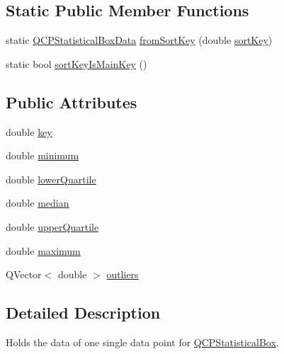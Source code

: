 \subsection*{Static Public Member Functions}
\begin{DoxyCompactItemize}
\item 
static \mbox{\hyperlink{class_q_c_p_statistical_box_data}{Q\+C\+P\+Statistical\+Box\+Data}} \mbox{\hyperlink{class_q_c_p_statistical_box_data_a8c391d5a6c7cebc79b664aad9917b499}{from\+Sort\+Key}} (double \mbox{\hyperlink{class_q_c_p_statistical_box_data_a168100275e85935207deec86216abc88}{sort\+Key}})
\item 
static bool \mbox{\hyperlink{class_q_c_p_statistical_box_data_a4710ae44b85d4b34b13c3f9301f28c01}{sort\+Key\+Is\+Main\+Key}} ()
\end{DoxyCompactItemize}
\subsection*{Public Attributes}
\begin{DoxyCompactItemize}
\item 
double \mbox{\hyperlink{class_q_c_p_statistical_box_data_a2d0b5ca5130e8a73294c46b8b2fd77b8}{key}}
\item 
double \mbox{\hyperlink{class_q_c_p_statistical_box_data_adc2f4b8cbff9f2e4a676f32bad8a7e3a}{minimum}}
\item 
double \mbox{\hyperlink{class_q_c_p_statistical_box_data_af9f478b4ea0789fa6cff7eebb654b5d4}{lower\+Quartile}}
\item 
double \mbox{\hyperlink{class_q_c_p_statistical_box_data_a116cd53ae6685979ec3b051cfc7dbba5}{median}}
\item 
double \mbox{\hyperlink{class_q_c_p_statistical_box_data_a5604dfe04b103e5ac73ce7895b46303b}{upper\+Quartile}}
\item 
double \mbox{\hyperlink{class_q_c_p_statistical_box_data_aa2800abda337decfc4277cb8bf846d6f}{maximum}}
\item 
Q\+Vector$<$ double $>$ \mbox{\hyperlink{class_q_c_p_statistical_box_data_abaa27539fbd941d3f1eb8169e881e308}{outliers}}
\end{DoxyCompactItemize}


\subsection{Detailed Description}
Holds the data of one single data point for \mbox{\hyperlink{class_q_c_p_statistical_box}{Q\+C\+P\+Statistical\+Box}}. 

